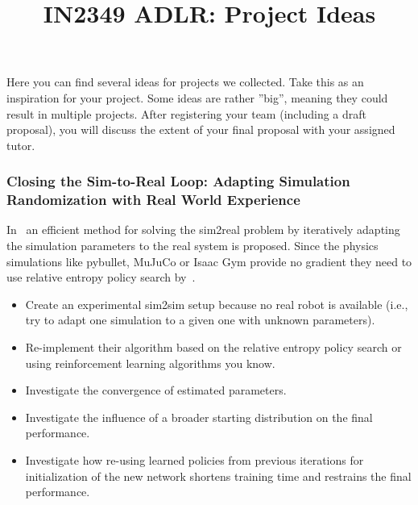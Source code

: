 \documentclass[a4paper]{article}
\title{IN2349 ADLR: Project Ideas}
\author{}
\begin{document}
\maketitle

Here you can find several ideas for projects we collected.
Take this as an inspiration for your project.
Some ideas are rather ”big”, meaning they could result in multiple projects.
After registering your team (including a draft proposal), you will discuss the extent of your final proposal with your assigned tutor.

\subsubsection{Closing the Sim-to-Real Loop: Adapting Simulation Randomization with Real World Experience}
In~\citet{Chebotar2018} an efficient method for solving the sim2real problem by iteratively adapting the simulation parameters to the real system is proposed.
Since the physics simulations like pybullet, MuJuCo or Isaac Gym provide no gradient they need to use relative entropy policy search by~\citet{peters2010}.

\begin{itemize}
  \item Create an experimental sim2sim setup because no real robot is available (i.e., try to adapt one simulation to a given one with unknown parameters).
  \item Re-implement their algorithm based on the relative entropy policy search or using reinforcement learning algorithms you know.
  \item Investigate the convergence of estimated parameters.
  \item Investigate the influence of a broader starting distribution on the final performance.
  \item Investigate how re-using learned policies from previous iterations for initialization of the new network shortens training time and restrains the final performance.
\end{itemize}
\end{document}
